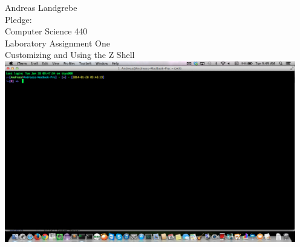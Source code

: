 \documentclass{article}
\begin{document}
\begin{center}
\Huge Andreas Landgrebe
\\
Pledge:
\\
Computer Science 440
\\
Laboratory Assignment One
\\
Customizing and Using the Z Shell
\\

\includegraphics[width=5in]{images/zsh.png}
\end{center}
\end{document}

